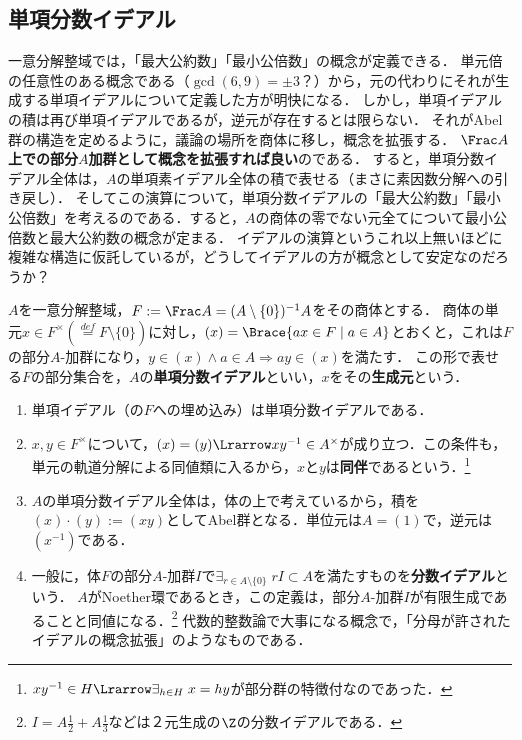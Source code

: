\documentclass[uplatex,dvipdfmx]{jsreport}
\begin{document}
\subsection{単項分数イデアル}

\begin{tcolorbox}[colframe=ForestGreen, colback=ForestGreen!10!white,breakable,colbacktitle=ForestGreen!40!white,coltitle=black,fonttitle=\bfseries\sffamily,
title=分数イデアル：分母が許されたイデアルの拡張を商体の部分$A$加群に注目して定義する]
    一意分解整域では，「最大公約数」「最小公倍数」の概念が定義できる．
    単元倍の任意性のある概念である（$\gcd(6,9)=\pm 3$？）から，元の代わりにそれが生成する単項イデアルについて定義した方が明快になる．
    しかし，単項イデアルの積は再び単項イデアルであるが，逆元が存在するとは限らない．
    それがAbel群の構造を定めるように，議論の場所を商体に移し，概念を拡張する．
    \textbf{$\Frac A$上での部分$A$加群として概念を拡張すれば良い}のである．
    すると，単項分数イデアル全体は，$A$の単項素イデアル全体の積で表せる（まさに素因数分解への引き戻し）．
    そしてこの演算について，単項分数イデアルの「最大公約数」「最小公倍数」を考えるのである．すると，$A$の商体の零でない元全てについて最小公倍数と最大公約数の概念が定まる．
    イデアルの演算というこれ以上無いほどに複雑な構造に仮託しているが，どうしてイデアルの方が概念として安定なのだろうか？
\end{tcolorbox}

\begin{definition}
    $A$を一意分解整域，$F:=\Frac A=(A\setminus\{0\})^{-1}A$をその商体とする．
    商体の単元$x\in F^\times(\overset{def}{=}F\setminus\{0\})$に対し，$(x)=\Brace{ax\in F\mid a\in A}$とおくと，これは$F$の部分$A$-加群になり，$y\in(x)\land a\in A\Rightarrow ay\in(x)$を満たす．
    この形で表せる$F$の部分集合を，$A$の\textbf{単項分数イデアル}といい，$x$をその\textbf{生成元}という．
\end{definition}
\begin{remark}\mbox{}\label{remark-PFI}
    \begin{enumerate}
        \item 単項イデアル（の$F$への埋め込み）は単項分数イデアルである．
        \item $x,y\in F^\times$について，$(x)=(y)\Lrarrow xy^{-1}\in A^\times$が成り立つ．この条件も，単元の軌道分解による同値類に入るから，$x$と$y$は\textbf{同伴}であるという．\footnote{$xy^{-1}\in H\Lrarrow\exists_{h\in H}\;x=hy$が部分群の特徴付なのであった．}
        \item $A$の単項分数イデアル全体は，体の上で考えているから，積を$(x)\cdot(y):=(xy)$としてAbel群となる．単位元は$A=(1)$で，逆元は$(x^{-1})$である．
        \item 一般に，体$F$の部分$A$-加群$I$で$\exists_{r\in A\setminus\{0\}}\;rI\subset A$を満たすものを\textbf{分数イデアル}という．
        $A$がNoether環であるとき，この定義は，部分$A$-加群$I$が有限生成であることと同値になる．\footnote{$I=A\frac{1}{2}+A\frac{1}{3}$などは２元生成の$\Z$の分数イデアルである．}
        代数的整数論で大事になる概念で，「分母が許されたイデアルの概念拡張」のようなものである．
    \end{enumerate}
\end{remark}
\end{document}

